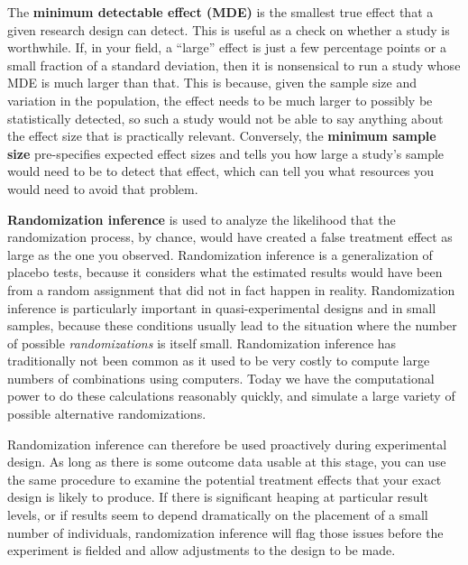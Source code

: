 The \textbf{minimum detectable effect (MDE)}
is the smallest true effect that a given research design can detect.
This is useful as a check on whether a study is worthwhile.
If, in your field, a ``large'' effect is just a few percentage points
or a small fraction of a standard deviation,
then it is nonsensical to run a study whose MDE is much larger than that.
This is because, given the sample size and variation in the population,
the effect needs to be much larger to possibly be statistically detected,
so such a study would not be able to say anything about the effect size that is practically relevant.
Conversely, the \textbf{minimum sample size} pre-specifies expected effect sizes
and tells you how large a study's sample would need to be to detect that effect,
which can tell you what resources you would need to avoid that problem.



\textbf{Randomization inference} is used to analyze the likelihood
that the randomization process, by chance,
would have created a false treatment effect as large as the one you observed.
Randomization inference is a generalization of placebo tests,
because it considers what the estimated results would have been
from a random assignment that did not in fact happen in reality.
Randomization inference is particularly important
in quasi-experimental designs and in small samples,
because these conditions usually lead to the situation
where the number of possible \textit{randomizations} is itself small.
Randomization inference has traditionally not been common
as it used to be very costly to compute large numbers of combinations using computers.
Today we have the computational power to do these calculations reasonably quickly,
and simulate a large variety of possible alternative randomizations.


Randomization inference can therefore be used proactively during experimental design.
As long as there is some outcome data usable at this stage,
you can use the same procedure to examine the potential treatment effects
that your exact design is likely to produce.
If there is significant heaping at particular result levels,
or if results seem to depend dramatically on the placement of a small number of individuals,
randomization inference will flag those issues before the experiment is fielded
and allow adjustments to the design to be made.
